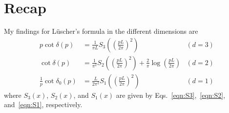 \documentclass[11pt]{article}
\begin{document}
\section{Recap}
My findings for L\"uscher's formula in the different dimensions are
\begin{align}
p\cot \delta(p)&=\frac{1}{\pi L}S_3\left(\left(\frac{pL}{2\pi}\right)^2\right)&(d=3)\\
\cot \delta(p)&=\frac{1}{\pi^2}S_2\left(\left(\frac{pL}{2\pi}\right)^2\right) +\frac{2}{\pi}\log\left(\frac{pL}{2\pi}\right)&(d=2)\\
\frac{1}{p}\cot\delta_0(p)&= 
\frac{L}{2\pi^2} S_1\left(\left(\frac{pL}{2\pi}\right)^2\right)
 &(d=1)
\end{align}
where $S_3(x)$, $S_2(x)$, and $S_1(x)$ are given by Eqs.~\eqref{eqn:S3},~\eqref{eqn:S2}, and~\eqref{eqn:S1}, respectively.






\end{document}
